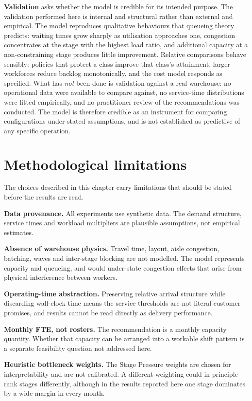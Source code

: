\textbf{Validation} asks whether the model is credible for its intended purpose. The validation
performed here is internal and structural rather than external and empirical. The model
reproduces qualitative behaviours that queueing theory predicts: waiting times grow sharply as
utilisation approaches one, congestion concentrates at the stage with the highest load ratio,
and additional capacity at a non-constraining stage produces little improvement. Relative
comparisons behave sensibly: policies that protect a class improve that class's attainment,
larger workforces reduce backlog monotonically, and the cost model responds as specified. What
has \emph{not} been done is validation against a real warehouse: no operational data were
available to compare against, no service-time distributions were fitted empirically, and no
practitioner review of the recommendations was conducted. The model is therefore credible as an
instrument for comparing configurations under stated assumptions, and is not established as
predictive of any specific operation.

\section{Methodological limitations}
\label{sec:method-limitations}

The choices described in this chapter carry limitations that should be stated before the
results are read.

\textbf{Data provenance.} All experiments use synthetic data. The demand structure, service
times and workload multipliers are plausible assumptions, not empirical estimates.

\textbf{Absence of warehouse physics.} Travel time, layout, aisle congestion, batching, waves
and inter-stage blocking are not modelled. The model represents capacity and queueing, and
would under-state congestion effects that arise from physical interference between workers.

\textbf{Operating-time abstraction.} Preserving relative arrival structure while discarding
wall-clock time means the service thresholds are not literal customer promises, and results
cannot be read directly as delivery performance.

\textbf{Monthly FTE, not rosters.} The recommendation is a monthly capacity quantity. Whether
that capacity can be arranged into a workable shift pattern is a separate feasibility question
not addressed here.

\textbf{Heuristic bottleneck weights.} The Stage Pressure weights are chosen for
interpretability and are not calibrated. A different weighting could in principle rank stages
differently, although in the results reported here one stage dominates by a wide margin in
every month.

